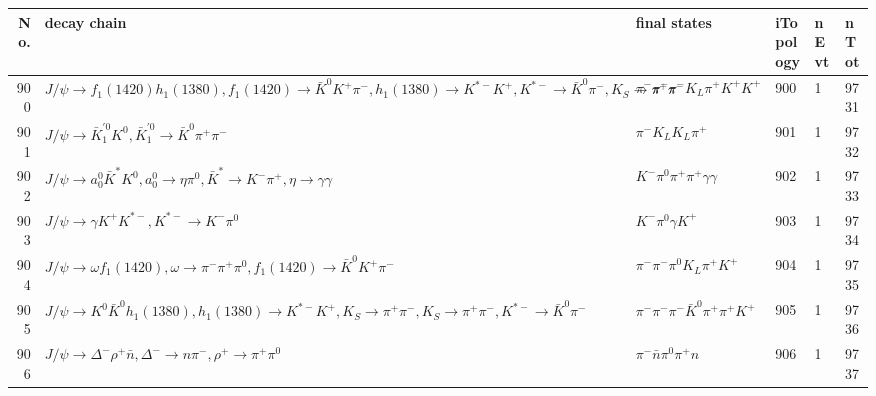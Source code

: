 \begin{table}[htbp] 
\begin{center}
\begin{small}
\begin{tabular}{rlllll}\hline\hline
 No. & decay chain & final states &  iTopology & nEvt & nTot \\\hline
900&$J/\psi       \rightarrow f_{1}(1420)    h_{1}(1380)    , f_{1}(1420)     \rightarrow \bar{K}^{0}   K^{+}          \pi^{-}        , h_{1}(1380)     \rightarrow K^{*-}         K^{+}          , K^{*-}          \rightarrow \bar{K}^{0}   \pi^{-}        , K_{S}           \rightarrow \pi^{+}        \pi^{-}        $&$\pi^{-}        \pi^{-}        \pi^{-}        K_{L}          \pi^{+}        K^{+}          K^{+}          $&  900&    1& 9731\\
901&$J/\psi       \rightarrow \bar{K}_1^{'0}K^{0}          , \bar{K}_1^{'0} \rightarrow \bar{K}^{0}   \pi^{+}        \pi^{-}        $&$\pi^{-}        K_{L}          K_{L}          \pi^{+}        $&  901&    1& 9732\\
902&$J/\psi       \rightarrow a_{0}^{0}      \bar{K}^{*}   K^{0}          , a_{0}^{0}       \rightarrow \eta          \pi^{0}        , \bar{K}^{*}    \rightarrow K^{-}          \pi^{+}        , \eta           \rightarrow \gamma       \gamma       $&$K^{-}          \pi^{0}        \pi^{+}        \pi^{+}        \gamma       \gamma       $&  902&    1& 9733\\
903&$J/\psi       \rightarrow \gamma       K^{+}          K^{*-}         , K^{*-}          \rightarrow K^{-}          \pi^{0}        $&$K^{-}          \pi^{0}        \gamma       K^{+}          $&  903&    1& 9734\\
904&$J/\psi       \rightarrow \omega         f_{1}(1420)    , \omega          \rightarrow \pi^{-}        \pi^{+}        \pi^{0}        , f_{1}(1420)     \rightarrow \bar{K}^{0}   K^{+}          \pi^{-}        $&$\pi^{-}        \pi^{-}        \pi^{0}        K_{L}          \pi^{+}        K^{+}          $&  904&    1& 9735\\
905&$J/\psi       \rightarrow K^{0}          \bar{K}^{0}   h_{1}(1380)    , h_{1}(1380)     \rightarrow K^{*-}         K^{+}          , K_{S}           \rightarrow \pi^{+}        \pi^{-}        , K_{S}           \rightarrow \pi^{+}        \pi^{-}        , K^{*-}          \rightarrow \bar{K}^{0}   \pi^{-}        $&$\pi^{-}        \pi^{-}        \pi^{-}        \bar{K}^{0}   \pi^{+}        \pi^{+}        K^{+}          $&  905&    1& 9736\\
906&$J/\psi       \rightarrow \Delta^-          \rho^{+}      \bar{n}          , \Delta^-           \rightarrow n                 \pi^{-}        , \rho^{+}       \rightarrow \pi^{+}        \pi^{0}        $&$\pi^{-}        \bar{n}          \pi^{0}        \pi^{+}        n                 $&  906&    1& 9737\\

\end{tabular}
\end{small}
\end{center}
\end{table}
